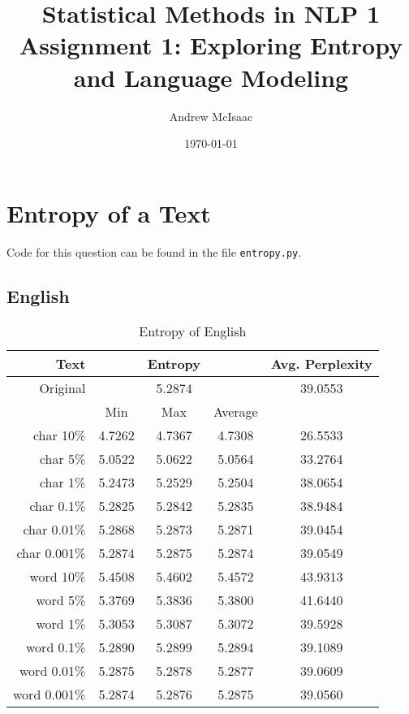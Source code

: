 \documentclass[a4paper]{article}
\title{Statistical Methods in NLP 1\\
Assignment 1: Exploring Entropy and Language Modeling}
\date{\today}
\author{Andrew McIsaac}
\begin{document}
\maketitle

\section{Entropy of a Text}

Code for this question can be found in the file \texttt{entropy.py}.

\subsection{English}

\begin{table}[htpb]
    \centering
    \caption{Entropy of English\\}
    \label{tab:en_entropy}
    \begin{tabular}{r|ccc|c}
        Text & & Entropy & & Avg. Perplexity \\
        \hline
        Original & & 5.2874 & & 39.0553\\
        \hline
             & Min & Max & Average & \\
        \hline
        char {10\%} & 4.7262 & 4.7367 & 4.7308 & 26.5533 \\
        char {5\%} & 5.0522 & 5.0622 & 5.0564 & 33.2764 \\
        char {1\%} & 5.2473 & 5.2529 & 5.2504 & 38.0654 \\
        char {0.1\%} & 5.2825 & 5.2842 & 5.2835 & 38.9484 \\
        char {0.01\%} & 5.2868 & 5.2873 & 5.2871 & 39.0454 \\
        char {0.001\%} & 5.2874 & 5.2875 & 5.2874 & 39.0549 \\
        \hline
        word {10\%} & 5.4508 & 5.4602 & 5.4572 & 43.9313 \\
        word {5\%} & 5.3769 & 5.3836 & 5.3800 & 41.6440 \\
        word {1\%} & 5.3053 & 5.3087 & 5.3072 & 39.5928 \\
        word {0.1\%} & 5.2890 & 5.2899 & 5.2894 & 39.1089 \\
        word {0.01\%} & 5.2875 & 5.2878 & 5.2877 & 39.0609 \\
        word {0.001\%} & 5.2874 & 5.2876 & 5.2875 & 39.0560 \\
    \end{tabular}
\end{table}
\end{document}
